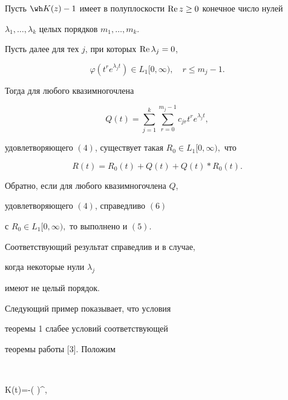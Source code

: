 \begin{thm}


Пусть $\wh K(z)-1$ имеет в полуплоскости $\operatorname{Re} z\geq 0$ конечное число нулей


$\lambda_1,\dotsc,\lambda_k$ целых порядков $m_1,\dotsc,m_k$.


Пусть далее для тех $j$, при которых $\operatorname{Re} \lambda_j=0$,


\begin{equation}


\varphi(t^re^{\lambda_j t})\in L_1[0,\infty),\quad r\leq m_j-1.


\end{equation}


Тогда для любого квазимногочлена


$$


Q(t)=\sum\limits_{j=1}^k \sum_{r=0}^{m_j-1} c_{j r}t^re^{\lambda_j t},


$$


удовлетворяющего $(4)$, существует такая $R_0\in L_1[0,\infty),$ что


\begin{equation}


R(t)=R_0(t)+Q(t)+Q(t)*R_0(t).


\end{equation}





Обратно, если для любого квазимногочлена $Q$, 


удовлетворяющего $(4)$, справедливо $(6)$


с $R_0\in L_1[0,\infty),$ то выполнено и $(5)$.


\end{thm}





Соответствующий результат справедлив и в случае, 


когда некоторые нули $\lambda_j$


имеют не целый порядок.





Следующий пример показывает, что условия 


теоремы 1 слабее условий соответствующей


теоремы работы [3]. Положим


$$


K(t)=-\bigg( \bigg)^{\prime},


